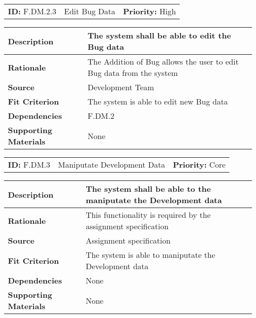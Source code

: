 \begin{table}[H]
    \begin{tabularx}{\textwidth}{| l | X | l |}
        \hline
        \textbf{ID:} F.DM.2.3 & Edit Bug Data & \textbf{Priority:} High \\
    \end{tabularx}
    \begin{tabularx}{\textwidth}{| l | X |}
        \hline
        \textbf{Description} & The system shall be able to edit the Bug data \\ \hline
        \textbf{Rationale} & The Addition of Bug allows the user to edit Bug data from the system\\ \hline
        \textbf{Source} & Development Team\\ \hline
        \textbf{Fit Criterion} & The system is able to edit new Bug data\\ \hline
        \textbf{Dependencies} & F.DM.2 \\ \hline
        \textbf{Supporting Materials} & None \\ \hline
    \end{tabularx}
\end{table}

\begin{table}[H]
    \begin{tabularx}{\textwidth}{| l | X | l |}
        \hline
        \textbf{ID:} F.DM.3 & Maniputate Development Data & \textbf{Priority:} Core \\
    \end{tabularx}
    \begin{tabularx}{\textwidth}{| l | X |}
        \hline
        \textbf{Description} & The system shall be able to the maniputate the Development data \\ \hline
        \textbf{Rationale} & This functionality is required by the assignment specification\\ \hline
        \textbf{Source} & Assignment specification\\ \hline
        \textbf{Fit Criterion} & The system is able to maniputate the Development data\\ \hline
        \textbf{Dependencies} & None \\ \hline
        \textbf{Supporting Materials} & None \\ \hline
    \end{tabularx}
\end{table}

